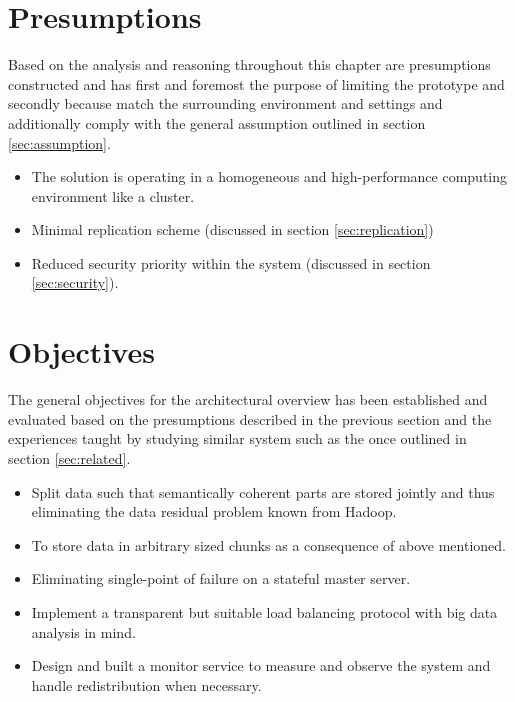 \section{Presumptions} \label{sec:presumptions}
Based on the analysis and reasoning throughout this chapter are presumptions constructed and has first and foremost the purpose of limiting the prototype and secondly because match the surrounding environment and settings and additionally comply with the general assumption outlined in section \ref{sec:assumption}.

\vspace*{2mm}
\begin{itemize}
	\item The solution is operating in a homogeneous and high-performance computing environment like a cluster.
	\item Minimal replication scheme (discussed in section \ref{sec:replication})
	\item Reduced security priority within the system (discussed in section \ref{sec:security}).
\end{itemize}
\vspace*{3mm}

\section{Objectives}
The general objectives for the architectural overview has been established and evaluated based on the presumptions described in the previous section and the experiences taught by studying similar system such as the once outlined in section \ref{sec:related}.

\vspace*{3mm}
\begin{itemize}
	\item Split data such that semantically coherent parts are stored jointly and thus eliminating the data residual problem known from Hadoop.
	\item To store data in arbitrary sized chunks as a consequence of above mentioned.
	\item Eliminating single-point of failure on a stateful master server.
	\item Implement a transparent but suitable load balancing protocol with big data analysis in mind.
	\item Design and built a monitor service to measure and observe the system and handle redistribution when necessary.
\end{itemize}
\vspace*{3mm}

